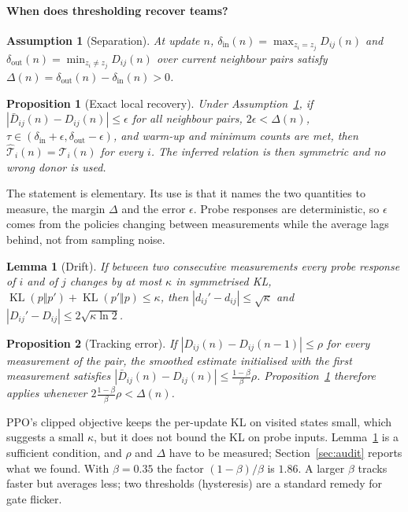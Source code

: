 \documentclass{article}
\newtheorem{proposition}{Proposition}
\newtheorem{lemma}{Lemma}
\newtheorem{assumption}{Assumption}
\theoremstyle{remark}
\newcommand{\KL}{\operatorname{KL}}
\begin{document}
\paragraph{When does thresholding recover teams?}
\begin{assumption}[Separation]
\label{as:separation}
At update $n$, $\delta_{\mathrm{in}}(n)=\max_{z_i=z_j}D_{ij}(n)$ and $\delta_{\mathrm{out}}(n)=\min_{z_i\ne z_j}D_{ij}(n)$ over
current neighbour pairs satisfy $\Delta(n)=\delta_{\mathrm{out}}(n)-\delta_{\mathrm{in}}(n)>0$.
\end{assumption}
\begin{proposition}[Exact local recovery]
\label{prop:recovery}
Under Assumption~\ref{as:separation}, if $|\bar D_{ij}(n)-D_{ij}(n)|\le\epsilon$ for all neighbour pairs, $2\epsilon<\Delta(n)$,
$\tau\in(\delta_{\mathrm{in}}+\epsilon,\delta_{\mathrm{out}}-\epsilon)$, and warm-up and minimum counts are met, then
$\hat{\mathcal{T}}_i(n)=\mathcal{T}_i(n)$ for every $i$. The inferred relation is then symmetric and no wrong donor is used.
\end{proposition}
The statement is elementary. Its use is that it names the two quantities to measure, the margin $\Delta$ and the error
$\epsilon$. Probe responses are deterministic, so $\epsilon$ comes from the policies changing between measurements while the
average lags behind, not from sampling noise.
\begin{lemma}[Drift]
\label{lem:drift}
If between two consecutive measurements every probe response of $i$ and of $j$ changes by at most $\kappa$ in symmetrised KL,
$\KL(p\Vert p')+\KL(p'\Vert p)\le\kappa$, then $|d_{ij}'-d_{ij}|\le\sqrt{\kappa}$ and $|D_{ij}'-D_{ij}|\le2\sqrt{\kappa\ln 2}$.
\end{lemma}
\begin{proposition}[Tracking error]
\label{prop:tracking}
If $|D_{ij}(n)-D_{ij}(n-1)|\le\rho$ for every measurement of the pair, the smoothed estimate initialised with the first
measurement satisfies $|\bar D_{ij}(n)-D_{ij}(n)|\le\frac{1-\beta}{\beta}\rho$. Proposition~\ref{prop:recovery} therefore
applies whenever $2\frac{1-\beta}{\beta}\rho<\Delta(n)$.
\end{proposition}
PPO's clipped objective keeps the per-update KL on visited states small, which suggests a small $\kappa$, but it does not
bound the KL on probe inputs. Lemma~\ref{lem:drift} is a sufficient condition, and $\rho$ and $\Delta$ have to be measured;
Section~\ref{sec:audit} reports what we found. With $\beta=0.35$ the factor $(1-\beta)/\beta$ is $1.86$. A larger $\beta$
tracks faster but averages less; two thresholds (hysteresis) are a standard remedy for gate flicker.
\end{document}
